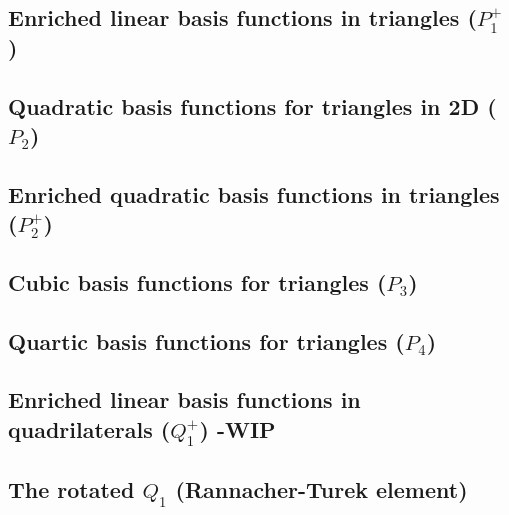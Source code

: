 \subsection{Enriched linear basis functions in triangles ($P_1^+$)}



\subsection{Quadratic basis functions for triangles in 2D ($P_2$)\label{basis:p2}}


\subsection{Enriched quadratic basis functions in triangles ($P_2^+$)}


\subsection{Cubic basis functions for triangles ($P_3$) \label{basis:p3}}


\subsection{Quartic basis functions for triangles ($P_4$)}


\subsection{Enriched linear basis functions in quadrilaterals ($Q_1^+$) -WIP} \label{ss:quadmini}


\subsection{The rotated $Q_1$ (Rannacher-Turek element)} \label{ss:rq1}


